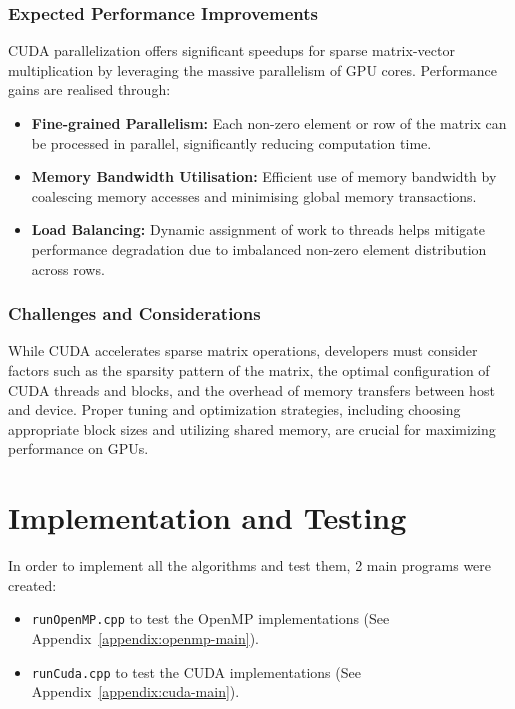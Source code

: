 \documentclass[12pt,oneside]{book} %
\begin{document}
\subsubsection{Expected Performance Improvements}

CUDA parallelization offers significant speedups for sparse matrix-vector
multiplication by leveraging the massive parallelism of GPU cores. Performance
gains are realised through:

\begin{itemize}
    \item \textbf{Fine-grained Parallelism:} Each non-zero element or row of the matrix can be processed in parallel, significantly reducing computation time.

    \item \textbf{Memory Bandwidth Utilisation:} Efficient use of memory bandwidth by coalescing memory accesses and minimising global memory transactions.

    \item \textbf{Load Balancing:} Dynamic assignment of work to threads helps mitigate performance degradation due to imbalanced non-zero element distribution across rows.
\end{itemize}

\subsubsection{Challenges and Considerations}

While CUDA accelerates sparse matrix operations, developers must consider
factors such as the sparsity pattern of the matrix, the optimal configuration
of CUDA threads and blocks, and the overhead of memory transfers between host
and device. Proper tuning and optimization strategies, including choosing
appropriate block sizes and utilizing shared memory, are crucial for maximizing
performance on GPUs.

\newpage
\section{Implementation and Testing}

In order to implement all the algorithms and test them, 2 main programs were
created:
\begin{itemize}
    \item \texttt{runOpenMP.cpp} to test the OpenMP implementations (See Appendix~\ref{appendix:openmp-main}).
    \item \texttt{runCuda.cpp} to test the CUDA implementations (See Appendix~\ref{appendix:cuda-main}).
\end{itemize}
\end{document}
